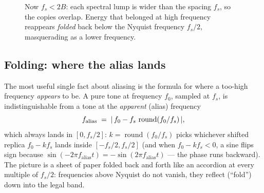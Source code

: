 \begin{figure}[H]
\centering
{}
\caption{Now $f_s < 2B$: each spectral lump is wider than the spacing $f_s$, so the
copies overlap. Energy that belonged at high frequency reappears \emph{folded} back
below the Nyquist frequency $f_s/2$, masquerading as a lower frequency.}
\label{ch18:fig-replication-bad}
\end{figure}

\subsection{Folding: where the alias lands}
\label{ch18:folding}

The most useful single fact about aliasing is the formula for where a too-high
frequency \emph{appears} to be. A pure tone at frequency $f_0$, sampled at $f_s$, is
indistinguishable from a tone at the \emph{apparent} (alias) frequency
\[
  f_{\text{alias}} \;=\; \lvert\,f_0 - f_s\,\operatorname{round}(f_0/f_s)\,\rvert,
\]
which always lands in $[0, f_s/2]$: $k = \operatorname{round}(f_0/f_s)$ picks whichever shifted replica $f_0 - k f_s$ lands inside $[-f_s/2, f_s/2]$ (and when $f_0 - k f_s < 0$, a sine flips sign because $\sin(-2\pi f_{\text{alias}} t) = -\sin(2\pi f_{\text{alias}} t)$ --- the phase runs backward). The picture is a sheet of paper folded back and
forth like an accordion at every multiple of $f_s/2$: frequencies above Nyquist do not
vanish, they reflect (``fold'') down into the legal band.

